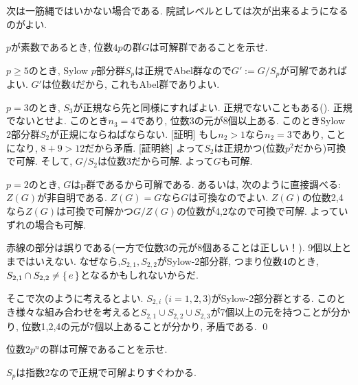 次は一筋縄ではいかない場合である. 院試レベルとしては次が出来るようになるのがよい.
\begin{egprob}
$p$が素数であるとき, 位数$4p$の群$G$は可解群であることを示せ.
\end{egprob}
\begin{miss}
$p\geq 5$のとき, Sylow $p$部分群$S_p$は正規でAbel群なので$G':=G/S_p$が可解であればよい. $G'$は位数4だから, これもAbel群でありよい. \par
$p=3$のとき, $S_3$が正規なら先と同様にすればよい. 正規でないこともある().  正規でないとせよ. このとき$n_3 = 4$であり, 位数3の元が$8$個以上ある. このときSylow 2部分群$S_2$が正規にならねばならない. [証明] もし$n_2 > 1$なら$n_2 = 3$であり, ことになり, $8+9  > 12$だから矛盾. [証明終] よって$S_2$は正規かつ(位数$p^2$だから)可換で可解. そして, $G/S_2$は位数3だから可解. よって$G$も可解. \par
$p=2$のとき, $G$はp群であるから可解である. あるいは, 次のように直接調べる: $Z(G)$が非自明である. $Z(G) = G$なら$G$は可換なのでよい. $Z(G)$の位数2,4なら$Z(G)$は可換で可解かつ$G/Z(G)$の位数が4,2なので可換で可解. よっていずれの場合も可解.
\end{miss}
\begin{egans}
赤線の部分は誤りである(一方で位数3の元が8個あることは正しい！). 9個以上とまではいえない. なぜなら,$S_{2,1},S_{2,2}$がSylow-2部分群, つまり位数4のとき, $S_{2,1}\cap S_{2,2} \neq \set{e}$となるかもしれないからだ. \par
そこで次のように考えるとよい. $S_{2,i}$ ($i=1,2,3$)がSylow-2部分群とする. このとき様々な組み合わせを考えると$S_{2,1}\cup S_{2,2}\cup S_{2,3}$が7個以上の元を持つことが分かり, 位数1,2,4の元が7個以上あることが分かり, 矛盾である. \qed
\end{egans}

\begin{egprob}
位数$2p^n$の群は可解であることを示せ.
\end{egprob}
\begin{egans}
$S_p$は指数2なので正規で可解よりすぐわかる.
\end{egans}

